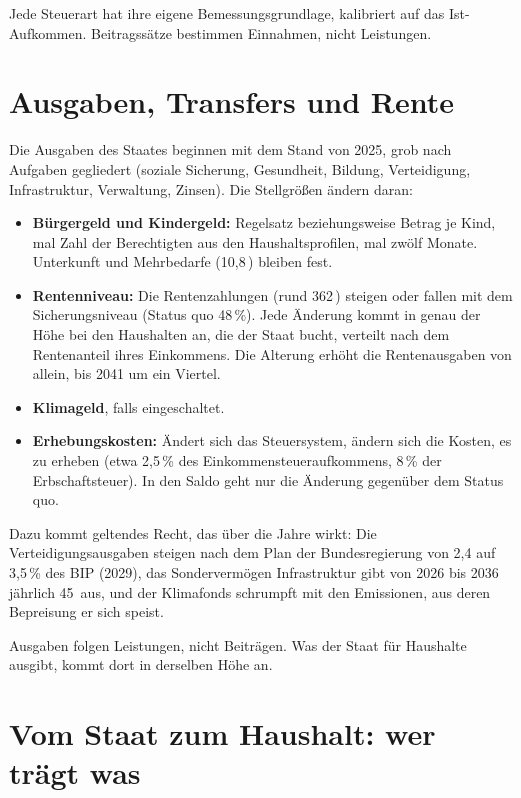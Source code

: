 \begin{merksatz}
Jede Steuerart hat ihre eigene Bemessungsgrundlage, kalibriert auf das Ist-Aufkommen.
Beitragssätze bestimmen Einnahmen, nicht Leistungen.
\end{merksatz}

\section{Ausgaben, Transfers und Rente}

Die Ausgaben des Staates beginnen mit dem Stand von 2025, grob nach Aufgaben gegliedert
(soziale Sicherung, Gesundheit, Bildung, Verteidigung, Infrastruktur, Verwaltung, Zinsen).
Die Stellgrößen ändern daran:

\begin{itemize}
\item \textbf{Bürgergeld und Kindergeld:} Regelsatz beziehungsweise Betrag je Kind, mal
  Zahl der Berechtigten aus den Haushaltsprofilen, mal zwölf Monate. Unterkunft und
  Mehrbedarfe (10,8\,\Mrd) bleiben fest.
\item \textbf{Rentenniveau:} Die Rentenzahlungen (rund 362\,\Mrd) steigen oder fallen mit dem
  Sicherungsniveau (Status quo 48\,\%). Jede Änderung kommt in genau der Höhe bei den
  Haushalten an, die der Staat bucht, verteilt nach dem Rentenanteil ihres Einkommens.
  Die Alterung erhöht die Rentenausgaben von allein, bis 2041 um ein Viertel.
\item \textbf{Klimageld}, falls eingeschaltet.
\item \textbf{Erhebungskosten:} Ändert sich das Steuersystem, ändern sich die Kosten, es zu
  erheben (etwa 2,5\,\% des Einkommensteueraufkommens, 8\,\% der Erbschaftsteuer). In den
  Saldo geht nur die Änderung gegenüber dem Status quo.
\end{itemize}

Dazu kommt geltendes Recht, das über die Jahre wirkt: Die Verteidigungsausgaben steigen nach
dem Plan der Bundesregierung von 2,4 auf 3,5\,\% des BIP (2029), das Sondervermögen
Infrastruktur gibt von 2026 bis 2036 jährlich 45\,\Mrd{} aus, und der Klimafonds schrumpft
mit den Emissionen, aus deren Bepreisung er sich speist.

\begin{merksatz}
Ausgaben folgen Leistungen, nicht Beiträgen. Was der Staat für Haushalte ausgibt, kommt dort
in derselben Höhe an.
\end{merksatz}

\section{Vom Staat zum Haushalt: wer trägt was}

